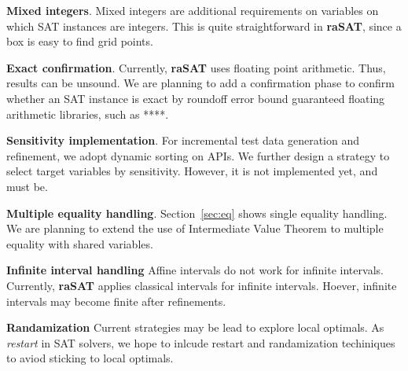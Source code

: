 \documentclass[runningheads,a4paper,oribibl]{llncs}
\begin{document}
\medskip \noindent 
{\bf Mixed integers}. 
Mixed integers are additional requirements on variables on which SAT instances are integers. 
This is quite straightforward in {\bf raSAT}, since a box is easy to find grid points. 

\medskip \noindent 
{\bf Exact confirmation}.
Currently, {\bf raSAT} uses floating point arithmetic. Thus, results can be unsound. 
We are planning to add a confirmation phase to confirm whether an SAT instance is exact
by roundoff error bound guaranteed floating arithmetic libraries, such as ****. 


\medskip \noindent 
{\bf Sensitivity implementation}. 
For incremental test data generation and refinement, we adopt dynamic sorting on APIs. 
We further design a strategy to select target variables by sensitivity. 
However, it is not implemented yet, and must be. 

\medskip \noindent 
{\bf Multiple equality handling}. 
Section~\ref{sec:eq} shows single equality handling. 
We are planning to extend the use of Intermediate Value Theorem to multiple equality with 
shared variables. 

\medskip \noindent 
{\bf Infinite interval handling}
Affine intervals do not work for infinite intervals. 
Currently, {\bf raSAT} applies classical intervals for infinite intervals. 
Hoever, infinite intervals may become finite after refinements. 


\medskip \noindent 
{\bf Randamization}
Current strategies may be lead to explore local optimals. 
As {\em restart} in SAT solvers, we hope to inlcude restart and randamization techiniques 
to aviod sticking to local optimals. 
\end{document}
